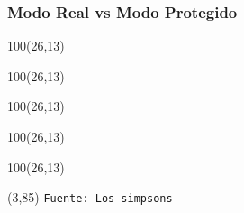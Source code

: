 \documentclass[aspectratio=169]{beamer}
\begin{document}
\begin{frame}
    \frametitle{Modo Real vs Modo Protegido}
    \begin{textblock}{100}(26,13)  \end{textblock}
    \begin{textblock}{100}(26,13)  \end{textblock}
    \begin{textblock}{100}(26,13)  \end{textblock}
    \begin{textblock}{100}(26,13)  \end{textblock}
    \begin{textblock}{100}(26,13)  \end{textblock}
    \begin{textblock}{55}(3,85)
    \scriptsize
    \texttt{Fuente: Los simpsons}
    \end{textblock}
\end{frame}
\end{document}
